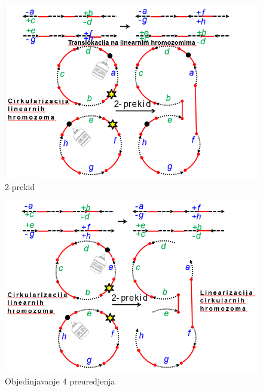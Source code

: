 \begin{minipage}{\textwidth}
	\centering
	\begin{minipage}{0.45\textwidth} 
		\begin{figure}[H]
			\centering
			\includegraphics[width=\textwidth]{poglavlja/6/slike/2_prekid_1.PNG}
			\caption{2-prekid}
			\label{slika:translok}
		\end{figure}
		
	\end{minipage}
	\hfill 
	\begin{minipage}{0.45\textwidth}
		\begin{figure}[H]
			\centering
			\includegraphics[width=\textwidth]{poglavlja/6/slike/2_prekid_2.PNG}
			\caption{Objedinjavanje 4 preuredjenja}
			\label{slika:objedinjavanje}
		\end{figure}
		
	\end{minipage}
	\vspace*{1em}
\end{minipage}



